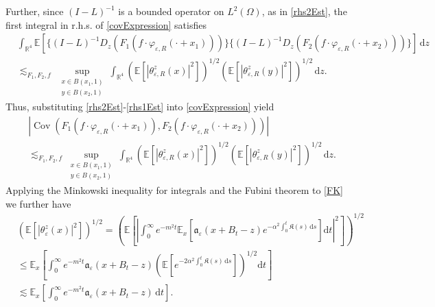 \documentclass{article}
\newcommand{\mathd}{\mathrm{d}}
\newcommand{\tmop}[1]{\ensuremath{\operatorname{#1}}}
\begin{document}
Further, since $(I - L)^{- 1}$ is a bounded operator on $L^2 (\Omega)$, as in \eqref{rhs2Est},  the first integral in r.h.s. of \eqref{covExpression} satisfies
%
\begin{align}  
    & \int_{\mathbb{R}^4} \mathbb{E} \left[\{ (I - L)^{- 1} D_z  (F_1 (f \cdot
		\varphi_{\varepsilon, R} (\cdot + x_1))) \} \{ (I - L)^{- 1} D_z  (F_2 (f
		\cdot \varphi_{\varepsilon, R} (\cdot + x_2))) \} \right] \, \mathd z \nonumber \\
    & \lesssim_{F_1, F_2, f}  ~ \sup_{\substack{x \in B (x_1, 1) \\ y \in B (x_2, 1)}} 
    \int_{\mathbb{R}^4} \left(\mathbb{E} \left[| \theta_{\varepsilon, R}^z (x) |^2 \right]\right)^{1 /
			2} \left(\mathbb{E} \left[| \theta_{\varepsilon, R}^z (y) |^2 \right]\right)^{1 /
			2} \,  \mathd z.
  \label{rhs1Est}
\end{align}
Thus, substituting \eqref{rhs2Est}-\eqref{rhs1Est} into \eqref{covExpression}
yield
\begin{align}
    & | \tmop{Cov} (F_1 (f \cdot \varphi_{\varepsilon, R} (\cdot + x_1)), F_2
    (f \cdot \varphi_{\varepsilon, R} (\cdot + x_2))) |\\
     & \lesssim_{F_1, F_2, f} \sup_{\substack{x \in B (x_1, 1) \\ y \in B (x_2, 1)}}
    \int_{\mathbb{R}^4} \left(\mathbb{E} \left[| \theta_{\varepsilon, R}^z (x) |^2 \right]\right)^{1 /
			2} \left(\mathbb{E} \left[| \theta_{\varepsilon, R}^z (y) |^2 \right]\right)^{1 /
			2} \,  \mathd z.
  \label{covEst}
\end{align}
%
Applying the Minkowski inequality for integrals and the Fubini theorem  to \eqref{FK} we further have
%
\begin{align}
    & \left(\mathbb{E} \left[| \theta_{\varepsilon}^z (x) |^2 \right] \right)^{1 / 2} =  \left( \mathbb{E} \left[ \left| \int_0^{\infty} e^{- m^2 t}
    \mathbb{E}_x \left[ \mathfrak{a}_{\varepsilon} (x + B_t - z) e^{- \alpha^2
    \int_0^t \mathfrak{K} (s) \, \mathd s} \right] \mathd t \right|^2 \right]
    \right)^{1 / 2} \nonumber\\
    & \leq  \mathbb{E}_x \left[ \int_0^{\infty} e^{- m^2 t}
    \mathfrak{a}_{\varepsilon} (x + B_t - z) \left( \mathbb{E} \left[ e^{- 2
    \alpha^2 \int_0^t \mathfrak{K} (s) \, \mathd  s} \right] \right)^{1 / 2} \mathd t    \right] \nonumber \\
    & \lesssim \mathbb{E}_x \left[ \int_0^{\infty} e^{- m^2 t}
    \mathfrak{a}_{\varepsilon} (x + B_t - z) \, \mathd t \right]. 
  \label{E-theta-est}
\end{align}
\end{document}
